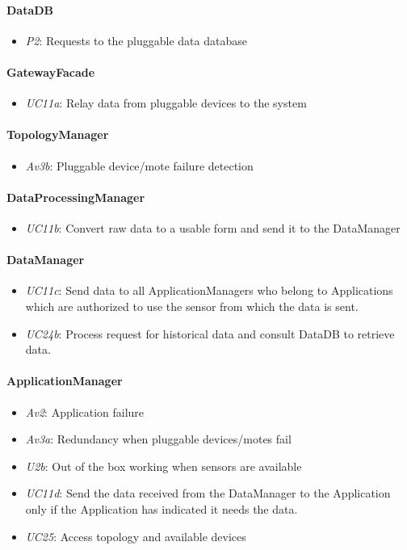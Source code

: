 \documentclass[english]{sareport}
\begin{document}
\paragraph{DataDB}
\begin{itemize}
	\item \emph{P2}: Requests to the pluggable data database
\end{itemize}

\paragraph{GatewayFacade}
\begin{itemize}
	\item \emph{UC11a}: Relay data from pluggable devices to the system
\end{itemize}

\paragraph{TopologyManager}
\begin{itemize}
	\item \emph{Av3b}: Pluggable device/mote failure detection
\end{itemize}

\paragraph{DataProcessingManager}
\begin{itemize}
	\item \emph{UC11b}: Convert raw data to a usable form and send it to the DataManager
\end{itemize}

\paragraph{DataManager}
\begin{itemize}
	\item \emph{UC11c}: Send data to all ApplicationManagers who belong to Applications which are authorized to use the sensor from which the data is sent.
	\item \emph{UC24b}: Process request for historical data and consult DataDB to retrieve data.
\end{itemize}

\paragraph{ApplicationManager}
\begin{itemize}
	\item \emph{Av2}: Application failure
	\item \emph{Av3a}: Redundancy when pluggable devices/motes fail
	\item \emph{U2b}: Out of the box working when sensors are available
	\item \emph{UC11d}: Send the data received from the DataManager to the Application only if the Application has indicated it needs the data.
	\item \emph{UC25}: Access topology and available devices
\end{itemize}
\end{document}
